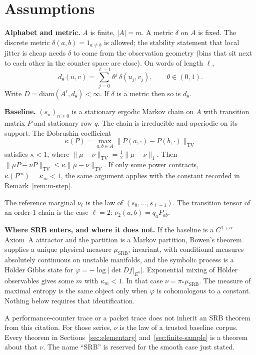 \documentclass[11pt,reqno]{amsart}
\theoremstyle{remark}
\newcommand{\TV}{\mathrm{TV}}
\newcommand{\SRB}{\mathrm{SRB}}
\newcommand{\diam}{\mathrm{diam}}
\begin{document}
\section{Assumptions}\label{sec:assumptions}

\noindent\textbf{Alphabet and metric.} $A$ is finite, $|A| = m$. A metric $\delta$ on $A$ is fixed. The discrete metric $\delta(a,b) = 1_{a \ne b}$ is allowed; the stability statement that local jitter is cheap needs $\delta$ to come from the observation geometry (bins that sit next to each other in the counter space are close). On words of length $\ell$,
\[
d_\theta(u,v) = \sum_{j=0}^{\ell-1} \theta^j \, \delta(u_j, v_j), \qquad \theta \in (0,1).
\]
Write $D = \diam(A^\ell, d_\theta) < \infty$. If $\delta$ is a metric then so is $d_\theta$.

\medskip\noindent\textbf{Baseline.} $(s_n)_{n \ge 0}$ is a stationary ergodic Markov chain on $A$ with transition matrix $P$ and stationary row $q$. The chain is irreducible and aperiodic on its support. The Dobrushin coefficient
\[
\kappa(P) = \max_{a,b \in A} \|P(a,\cdot) - P(b,\cdot)\|_{\TV}
\]
satisfies $\kappa < 1$, where $\|\mu-\nu\|_{\TV} = \tfrac12 \|\mu-\nu\|_1$. Then $\|\mu P - \nu P\|_{\TV} \le \kappa \|\mu-\nu\|_{\TV}$. If only some power contracts, $\kappa(P^m) = \kappa_m < 1$, the same argument applies with the constant recorded in Remark~\ref{rem:m-step}.

The reference marginal $\nu_\ell$ is the law of $(s_0,\ldots,s_{\ell-1})$. The transition tensor of an order-$1$ chain is the case $\ell = 2$: $\nu_2(a,b) = q_a P_{ab}$.

\medskip\noindent\textbf{Where SRB enters, and where it does not.} If the baseline is a $C^{1+\alpha}$ Axiom~A attractor and the partition is a Markov partition, Bowen's theorem supplies a unique physical measure $\mu_{\SRB}$, invariant, with conditional measures absolutely continuous on unstable manifolds, and the symbolic process is a H\"older Gibbs state for $\varphi = -\log |\det Df|_{E^u}|$. Exponential mixing of H\"older observables gives some $m$ with $\kappa_m < 1$. In that case $\nu = \pi_* \mu_{\SRB}$. The measure of maximal entropy is the same object only when $\varphi$ is cohomologous to a constant. Nothing below requires that identification.

A performance-counter trace or a packet trace does not inherit an SRB theorem from this citation. For those series, $\nu$ is the law of a trusted baseline corpus. Every theorem in Sections~\ref{sec:elementary} and~\ref{sec:finite-sample} is a theorem about that $\nu$. The name ``SRB'' is reserved for the smooth case just stated.
\end{document}
